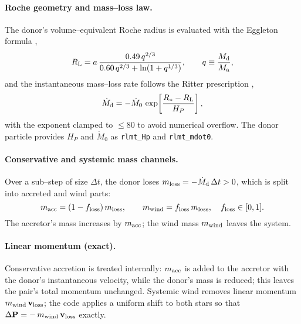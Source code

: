 \documentclass[11pt]{article}
\begin{document}
\paragraph{Roche geometry and mass–loss law.}
The donor’s volume–equivalent Roche radius is evaluated with the Eggleton
formula \citep{Eggleton1983},
\begin{equation}
R_{\rm L} = a\,\frac{0.49\,q^{2/3}}{0.60\,q^{2/3} + \ln(1+q^{1/3})},
\qquad q \equiv \frac{M_{\rm d}}{M_{\rm a}},
\end{equation}
and the instantaneous mass–loss rate follows the Ritter prescription
\citep{Ritter1988},
\begin{equation}
\dot M_{\rm d} = -\dot M_0\,
\exp\!\left[\frac{R_\ast - R_{\rm L}}{H_P}\right],
\end{equation}
with the exponent clamped to $\le 80$ to avoid numerical overflow. The donor
particle provides $H_P$ and $\dot M_0$ as \texttt{rlmt\_Hp} and
\texttt{rlmt\_mdot0}.

\paragraph{Conservative and systemic mass channels.}
Over a sub–step of size $\Delta t$, the donor loses $m_{\rm loss}=-\dot M_{\rm d}\,\Delta t>0$,
which is split into accreted and wind parts:
\[
m_{\rm acc} = (1-f_{\rm loss})\,m_{\rm loss},\qquad
m_{\rm wind} = f_{\rm loss}\,m_{\rm loss},\quad f_{\rm loss}\in[0,1].
\]
The accretor’s mass increases by $m_{\rm acc}$; the wind mass $m_{\rm wind}$
leaves the system.

\paragraph{Linear momentum (exact).}
Conservative accretion is treated internally: $m_{\rm acc}$ is added to the
accretor with the donor’s instantaneous velocity, while the donor’s mass is
reduced; this leaves the pair’s total momentum unchanged. Systemic wind
removes linear momentum $m_{\rm wind}\,\mathbf v_{\rm loss}$; the code applies a
uniform shift to both stars so that
$\Delta \mathbf P = -\,m_{\rm wind}\,\mathbf v_{\rm loss}$ exactly.
\end{document}
